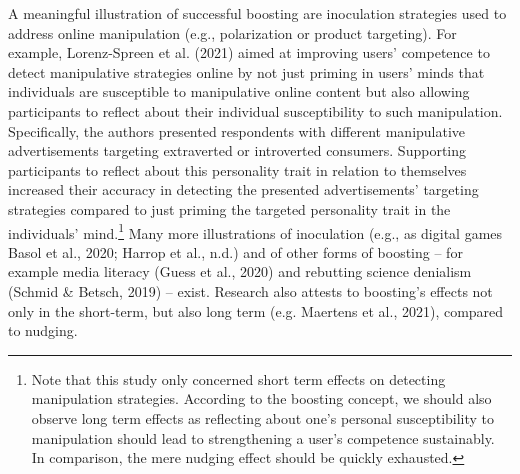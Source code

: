 \documentclass[reflection, authordate]{jote-new-article}
\begin{document}
A meaningful illustration of successful boosting are inoculation strategies used to address online manipulation (e.g., polarization or product targeting). For example, Lorenz-Spreen et al. (2021) aimed at improving users’ competence to detect manipulative strategies online by not just priming in users’ minds that individuals are susceptible to manipulative online content but also allowing participants to reflect about their individual susceptibility to such manipulation. Specifically, the authors presented respondents with different manipulative advertisements targeting extraverted or introverted consumers. Supporting participants to reflect about this personality trait in relation to themselves increased their accuracy in detecting the presented advertisements’ targeting strategies compared to just priming the targeted personality trait in the individuals’ mind.\footnote{ Note that this study only concerned short term effects on detecting manipulation strategies. According to the boosting concept, we should also observe long term effects as reflecting about one’s personal susceptibility to manipulation should lead to strengthening a user’s competence sustainably. In comparison, the mere nudging effect should be quickly exhausted.} Many more illustrations of inoculation (e.g., as digital games Basol et al., 2020; Harrop et al., n.d.) and of other forms of boosting – for example media literacy  (Guess et al., 2020) and rebutting science denialism (Schmid \& Betsch, 2019) – exist. Research also attests to boosting’s effects not only in the short-term, but also long term (e.g. Maertens et al., 2021), compared to nudging.
\end{document}
